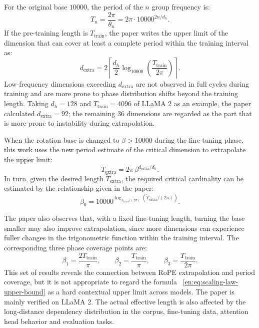 \documentclass[UTF8,fontset=none,a4paper,10pt]{ctexart}
\begin{document}
For the original base $10000$, the period of the $n$ group frequency is:
\begin{equation}
  T_n=\frac{2\pi}{\theta_n}=2\pi\cdot10000^{2n/d_h}.
  \label{en:eq:scaling-period}
\end{equation}
If the pre-training length is $T_{\mathrm{train}}$, the paper writes the upper limit of the dimension that can cover at least a complete period within the training interval as:
\begin{equation}
  d_{\mathrm{extra}}
  =2\left\lceil
  \frac{d_h}{2}\log_{10000}\!\left(\frac{T_{\mathrm{train}}}{2\pi}\right)
  \right\rceil.
  \label{en:eq:critical-dimension-scaling-law}
\end{equation}
Low-frequency dimensions exceeding $d_{\mathrm{extra}}$ are not observed in full cycles during training and are more prone to phase distribution shifts beyond the training length. Taking $d_h=128$ and $T_{\mathrm{train}}=4096$ of LLaMA 2 as an example, the paper calculated $d_{\mathrm{extra}}=92$; the remaining 36 dimensions are regarded as the part \cite{en:liu2024scalingrope} that is more prone to instability during extrapolation.

When the rotation base is changed to $\beta>10000$ during the fine-tuning phase, this work uses the new period estimate of the critical dimension to extrapolate the upper limit:
\begin{equation}
  T_{\mathrm{extra}}
  =2\pi\,\beta^{d_{\mathrm{extra}}/d_h}.
  \label{en:eq:scaling-law-upper-bound}
\end{equation}
In turn, given the desired length $\widetilde T_{\mathrm{extra}}$, the required critical cardinality can be estimated by the relationship given in the paper:
\begin{equation}
  \beta_0
  =10000^{\log_{T_{\mathrm{train}}/(2\pi)}
  \left(\widetilde T_{\mathrm{extra}}/(2\pi)\right)}.
  \label{en:eq:scaling-law-critical-base}
\end{equation}

The paper also observes that, with a fixed fine-tuning length, turning the base smaller may also improve extrapolation, since more dimensions can experience fuller changes in the trigonometric function within the training interval. The corresponding three phase coverage points are:
\begin{equation}
  \beta_1=\frac{2T_{\mathrm{train}}}{\pi},\qquad
  \beta_2=\frac{T_{\mathrm{train}}}{\pi},\qquad
  \beta_3=\frac{T_{\mathrm{train}}}{2\pi}.
  \label{en:eq:scaling-law-small-base}
\end{equation}
This set of results reveals the connection between RoPE extrapolation and period coverage, but it is not appropriate to regard the formula ~\eqref{en:eq:scaling-law-upper-bound} as a hard contextual upper limit across models. The paper is mainly verified on LLaMA 2. The actual effective length is also affected by the long-distance dependency distribution in the corpus, fine-tuning data, attention head behavior and evaluation tasks.
\end{document}
